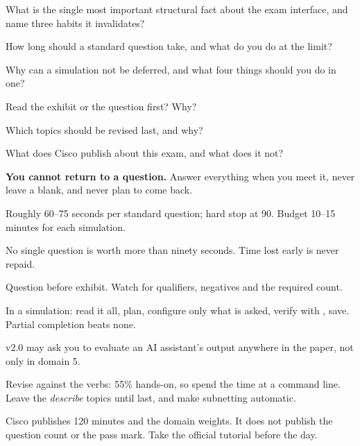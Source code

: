 \begin{checkpoint}
\begin{tightnum}
  \item What is the single most important structural fact about the exam
        interface, and name three habits it invalidates?
  \item How long should a standard question take, and what do you do at the
        limit?
  \item Why can a simulation not be deferred, and what four things should you do
        in one?
  \item Read the exhibit or the question first? Why?
  \item Which topics should be revised last, and why?
  \item What does Cisco publish about this exam, and what does it not?
\end{tightnum}
\end{checkpoint}

\begin{chaptersummary}
\begin{tight}
  \item \textbf{You cannot return to a question.} Answer everything when you meet
        it, never leave a blank, and never plan to come back.
  \item Roughly 60--75 seconds per standard question; hard stop at 90. Budget
        10--15 minutes for each simulation.
  \item No single question is worth more than ninety seconds. Time lost early is
        never repaid.
  \item Question before exhibit. Watch for qualifiers, negatives and the required
        count.
  \item In a simulation: read it all, plan, configure only what is asked, verify
        with , save. Partial completion beats none.
  \item v2.0 may ask you to evaluate an AI assistant's output anywhere in the
        paper, not only in domain 5.
  \item Revise against the verbs: 55\% hands-on, so spend the time at a command
        line. Leave the \emph{describe} topics until last, and make subnetting
        automatic.
  \item Cisco publishes 120 minutes and the domain weights. It does not publish
        the question count or the pass mark. Take the official tutorial before
        the day.
\end{tight}
\end{chaptersummary}

